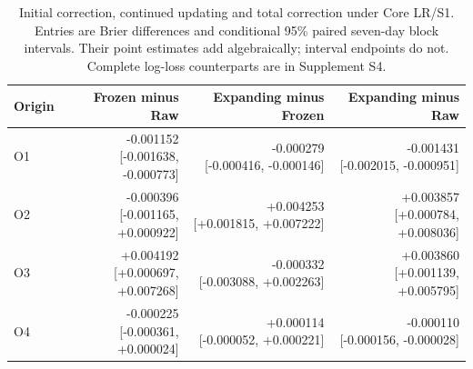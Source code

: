 \begin{table}[t]
\caption{Initial correction, continued updating and total correction under Core LR/S1. Entries are Brier differences and conditional 95\% paired seven-day block intervals. Their point estimates add algebraically; interval endpoints do not. Complete log-loss counterparts are in Supplement S4.}
\label{tab:triplets}\centering\footnotesize\setlength{\tabcolsep}{6pt}
\begin{tabular}{lrrr}\toprule
Origin & Frozen minus Raw & Expanding minus Frozen & Expanding minus Raw\\\midrule
O1 & \shortstack{-0.001152\\{}[-0.001638, -0.000773]} & \shortstack{-0.000279\\{}[-0.000416, -0.000146]} & \shortstack{-0.001431\\{}[-0.002015, -0.000951]}\\
O2 & \shortstack{-0.000396\\{}[-0.001165, +0.000922]} & \shortstack{+0.004253\\{}[+0.001815, +0.007222]} & \shortstack{+0.003857\\{}[+0.000784, +0.008036]}\\
O3 & \shortstack{+0.004192\\{}[+0.000697, +0.007268]} & \shortstack{-0.000332\\{}[-0.003088, +0.002263]} & \shortstack{+0.003860\\{}[+0.001139, +0.005795]}\\
O4 & \shortstack{-0.000225\\{}[-0.000361, +0.000024]} & \shortstack{+0.000114\\{}[-0.000052, +0.000221]} & \shortstack{-0.000110\\{}[-0.000156, -0.000028]}\\
\bottomrule\end{tabular}
\end{table}